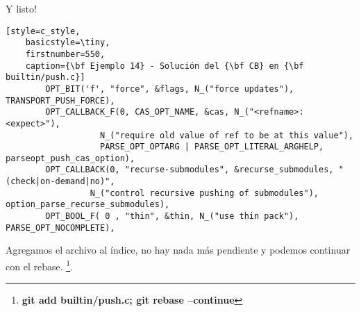 Y listo!
\begin{lstlisting}[style=c_style,
	basicstyle=\tiny,
	firstnumber=550,
	caption={\bf Ejemplo 14} - Solución del {\bf CB} en {\bf builtin/push.c}]
		OPT_BIT('f', "force", &flags, N_("force updates"), TRANSPORT_PUSH_FORCE),
		OPT_CALLBACK_F(0, CAS_OPT_NAME, &cas, N_("<refname>:<expect>"),
			       N_("require old value of ref to be at this value"),
			       PARSE_OPT_OPTARG | PARSE_OPT_LITERAL_ARGHELP, parseopt_push_cas_option),
		OPT_CALLBACK(0, "recurse-submodules", &recurse_submodules, "(check|on-demand|no)",
			     N_("control recursive pushing of submodules"), option_parse_recurse_submodules),
		OPT_BOOL_F( 0 , "thin", &thin, N_("use thin pack"), PARSE_OPT_NOCOMPLETE),
\end{lstlisting}

Agregamos el archivo al índice, no hay nada más pendiente y podemos continuar con el rebase.
\footnote{{\bf git add builtin/push.c; git rebase --continue}}.


